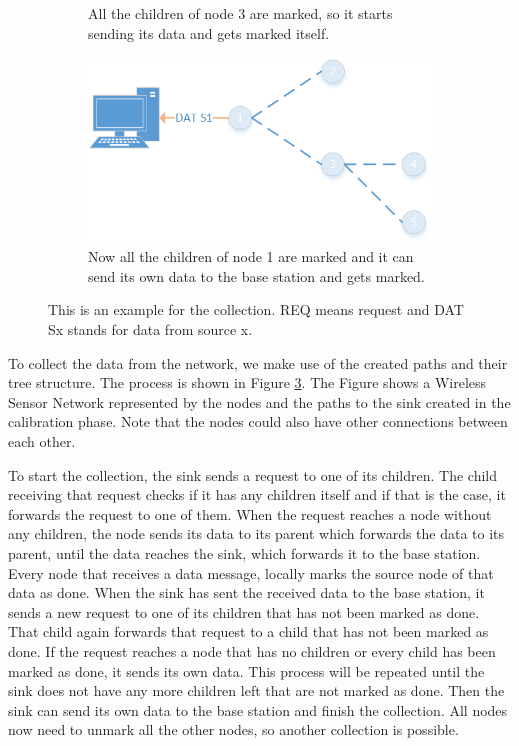 \begin{figure}[htbp]
\begin{subfigure}[t]{0.4\textwidth}
        \caption{All the children of node 3 are marked, so it starts sending its data and gets marked itself.}
        \label{fig:coll8}
    \end{subfigure}
    \quad
    \quad
    \begin{subfigure}[t]{0.4\textwidth}
		\centering         
        \includegraphics[scale=0.6]{content/images/Collection/Part9}
        \caption{Now all the children of node 1 are marked and it can send its own data to the base station and gets marked.}
        \label{fig:coll9}
    \end{subfigure}
    \caption{This is an example for the collection. REQ means request and DAT Sx stands for data from source x.}
    \label{fig:coll}
\end{figure}

To collect the data from the network, we make use of the created paths and their tree structure. The process is shown in Figure \ref{fig:coll}. The Figure shows a Wireless Sensor Network represented by the nodes and the paths to the sink created in the calibration phase. Note that the nodes could also have other connections between each other. 

To start the collection, the sink sends a request to one of its children. The child receiving that request checks if it has any children itself and if that is the case, it forwards the request to one of them. When the request reaches a node without any children, the node sends its data to its parent which forwards the data to its parent, until the data reaches the sink, which forwards it to the base station. Every node that receives a data message, locally marks the source node of that data as done. When the sink has sent the received data to the base station, it sends a new request to one of its children that has not been marked as done. That child again forwards that request to a child that has not been marked as done. If the request reaches a node that has no children or every child has been marked as done, it sends its own data. This process will be repeated until the sink does not have any more children left that are not marked as done. Then the sink can send its own data to the base station and finish the collection. All nodes now need to unmark all the other nodes, so another collection is possible.

